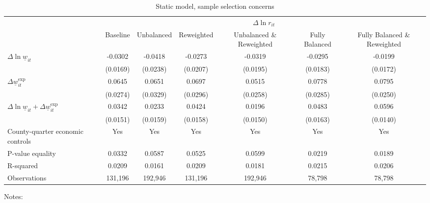 \begin{table}
    \caption{Static model, sample selection concerns}
    \label{tab:static_sample}

    \begin{tabular}{@{}lcccccc@{}}
        \toprule
                                                        & \multicolumn{6}{c}{$\Delta \ln r_{it}$}                                       \\ \cmidrule(l){2-5} 
                                                        & Baseline & Unbalanced & Reweighted & Unbalanced \& Reweighted & Fully Balanced & Fully Balanced \& Reweighted  \\ \midrule
        $\Delta \ln \underline{w}_{it}$                 & -0.0302      & -0.0418        & -0.0273       & -0.0319      & -0.0295    & -0.0199      \\
                                                        & (0.0169)    & (0.0238)      & (0.0207)     & (0.0195)    & (0.0183)   & (0.0172)                         \\
        $\Delta \underline{w}_{it}^{\text{exp}}$        & 0.0645      & 0.0651        & 0.0697       & 0.0515      & 0.0778     & 0.0795                        \\
                                                        & (0.0274)    & (0.0329)      & (0.0296)     & (0.0258)    & (0.0285)     & (0.0250)                                 \\ \midrule
        $\Delta \ln \underline{w}_{it}
          +  \Delta \underline{w}_{it}^{\text{exp}}$    & 0.0342      & 0.0233        & 0.0424       & 0.0196      & 0.0483       & 0.0596                                \\
                                                        & (0.0151)    & (0.0159)      & (0.0158)     & (0.0150)    & (0.0163)     & (0.0140)                                  \\ \midrule
        County-quarter economic controls                & Yes      & Yes        & Yes       & Yes      & Yes       & Yes                               \\
        P-value equality                                & 0.0332      & 0.0587        & 0.0525       & 0.0599      & 0.0219       & 0.0189                           \\
        R-squared                                       & 0.0209      & 0.0161        & 0.0209       & 0.0181      & 0.0215       & 0.0206                             \\
        Observations                                    & 131,196     & 192,946       & 131,196      & 192,946     & 78,798      & 78,798                       \\ \bottomrule
    \end{tabular}

    \begin{minipage}{.95\textwidth} \footnotesize
        \vspace{2mm}
        Notes: 
    \end{minipage}
\end{table}
